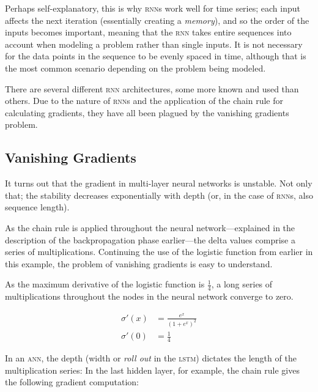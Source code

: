 \begin{multicols}{2}
Perhaps self-explanatory, this is why \textsc{rnn}s work well for time series;
each input affects the next iteration (essentially creating a \textit{memory}),
and so the order of the inputs becomes important, meaning that the \textsc{rnn}
takes entire sequences into account when modeling a problem rather than single
inputs.  It is not necessary for the data points in the sequence to be evenly
spaced in time, although that is the most common scenario depending on the
problem being modeled.

There are several different \textsc{rnn} architectures, some more known and used
than others.  Due to the nature of \textsc{rnn}s and the application of the
chain rule for calculating gradients, they have all been plagued by the
vanishing gradients problem.

\subsection{Vanishing Gradients}

It turns out that the gradient in multi-layer neural networks is unstable.  Not
only that; the stability decreases exponentially with depth (or, in the case of
\textsc{rnn}s, also sequence length).

As the chain rule is applied throughout the neural network---explained in the
description of the backpropagation phase earlier---the delta values comprise
a series of multiplications.  Continuing the use of the logistic function from
earlier in this example, the problem of vanishing gradients is easy to
understand.

As the maximum derivative of the logistic function is $\frac{1}{4}$, a long
series of multiplications throughout the nodes in the neural network converge to
zero.

\begin{Figure}
  \begin{align*}
    \sigma'(x) & = \frac{e^x}{{(1+e^x)}^2} \\
    \sigma'(0) & = \frac{1}{4}
  \end{align*}
\end{Figure}

\noindent In an \textsc{ann}, the depth (width or \textit{roll out} in the
\textsc{lstm}) dictates the length of the multiplication series: In the last
hidden layer, for example, the chain rule gives the following gradient
computation:


\end{multicols}
